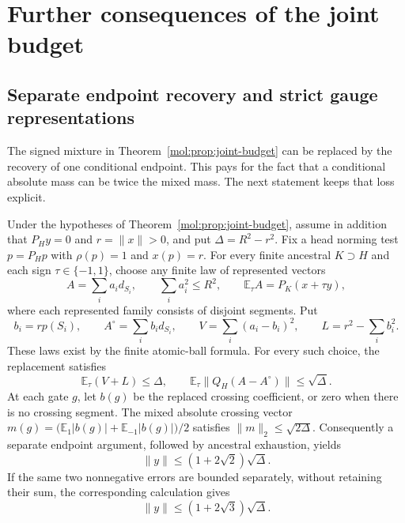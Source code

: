 \section{Further consequences of the joint budget}\label{sec:joint-consequences}
\subsection{Separate endpoint recovery and strict gauge representations}

The signed mixture in Theorem~\ref{mol:prop:joint-budget} can be
replaced by the recovery of one conditional endpoint.  This pays for
the fact that a conditional absolute mass can be twice the mixed mass.
The next statement keeps that loss explicit.

\begin{proposition}\label{mol:prop:conditional-joint}
Under the hypotheses of Theorem~\ref{mol:prop:joint-budget}, assume
in addition that $P_Hy=0$ and $r=\|x\|>0$, and put $\Delta=R^2-r^2$.
Fix a head norming test $p=P_Hp$ with $\rho(p)=1$ and $x(p)=r$.
For every finite ancestral $K\supset H$ and each sign
$\tau\in\{-1,1\}$, choose any finite law of represented vectors
\[
 A=\sum_i a_i d_{S_i},\qquad \sum_i a_i^2\le R^2,
 \qquad \mathbb E_\tau A=P_K(x+\tau y),
\]
where each represented family consists of disjoint segments. Put
\[
 b_i=r p(S_i),\qquad A^\circ=\sum_i b_i d_{S_i},\qquad
 V=\sum_i(a_i-b_i)^2,\qquad L=r^2-\sum_i b_i^2.
\]
These laws exist by the finite atomic-ball formula. For every such
choice, the replacement satisfies
\begin{equation}\label{mol:eq:conditional-joint}
 \mathbb E_\tau(V+L)\le\Delta,
 \qquad
 \mathbb E_\tau\|Q_H(A-A^\circ)\|\le\sqrt\Delta.
\end{equation}
At each gate $g$, let $b(g)$ be the replaced crossing coefficient,
or zero when there is no crossing segment. The mixed absolute crossing
vector
$m(g)=\bigl(\mathbb E_1|b(g)|+\mathbb E_{-1}|b(g)|\bigr)/2$
satisfies $\|m\|_2\le\sqrt{2\Delta}$. Consequently a separate
endpoint argument, followed by ancestral exhaustion, yields
\begin{equation}\label{mol:eq:conditional-joint-tail}
 \|y\|\le(1+2\sqrt2)\sqrt\Delta.
\end{equation}
If the same two nonnegative errors are bounded separately, without
retaining their sum, the corresponding calculation gives
\begin{equation}\label{mol:eq:strict-gauge-tail}
 \|y\|\le(1+2\sqrt3)\sqrt\Delta.
\end{equation}
\end{proposition}


